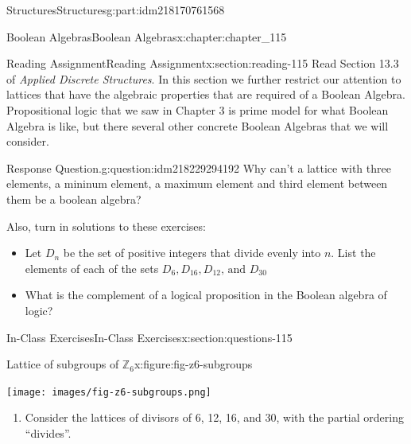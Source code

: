 \documentclass[oneside,10pt,]{book}
\numberwithin{equation}{section}
\begin{document}
\begin{partptx}{Structures}{}{Structures}{}{}{g:part:idm218170761568}
\typeout{************************************************}
%
\begin{chapterptx}{Boolean Algebras}{}{Boolean Algebras}{}{}{x:chapter:chapter_115}
%
%
%
\typeout{************************************************}
\typeout{************************************************}
%
\begin{sectionptx}{Reading Assignment}{}{Reading Assignment}{}{}{x:section:reading-115}
Read Section 13.3 of \emph{Applied Discrete Structures}.  In this section we further restrict our attention to lattices that have the algebraic properties that are required of a Boolean Algebra. Propositional logic that we saw in Chapter 3 is prime model for what Boolean Algebra is like, but there several other concrete Boolean Algebras that we will consider.%
\begin{question}{Response Question.}{g:question:idm218229294192}%
Why can't a lattice with three elements, a mininum element, a maximum element and third element between them be a boolean algebra?%
\end{question}
Also, turn in solutions to these exercises:%
\begin{itemize}[label=\textbullet]
\item{}Let \(D_n\) be the set of positive integers that divide evenly into \(n\).  List the elements of each of the sets \(D_{6}, D_{16}, D_{12}\textrm{, and }D_{30}\)%
\item{}What is the complement of a logical proposition in the Boolean algebra of logic?%
\end{itemize}
%
\end{sectionptx}
%
%
\typeout{************************************************}
\typeout{************************************************}
%
\begin{sectionptx}{In-Class Exercises}{}{In-Class Exercises}{}{}{x:section:questions-115}
\begin{figureptx}{Lattice of subgroups of \(\mathbb{Z}_{6}\)}{x:figure:fig-z6-subgroups}{}%
\begin{image}{0.3}{0.4}{0.3}%
\texttt{[image: images/fig-z6-subgroups.png]}
\end{image}%
\tcblower
\end{figureptx}%
%
\begin{enumerate}[label=\arabic*.]
\item{}Consider the lattices of divisors of 6, 12, 16, and 30, with the partial ordering ``divides''.%

\end{enumerate}
\end{sectionptx}
\end{chapterptx}
\end{partptx}
\end{document}
